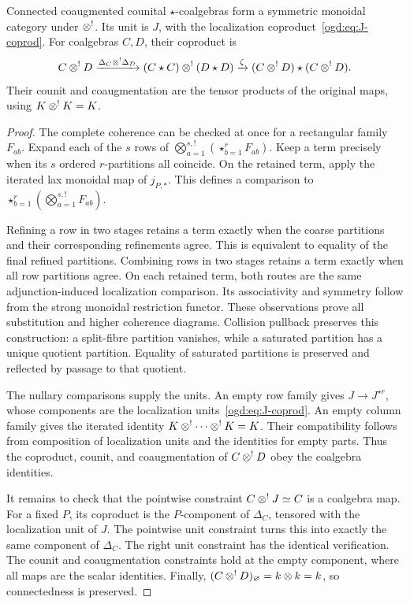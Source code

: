 \begin{proposition}\label{ogd:prop:coalgtensor}
Connected coaugmented counital \(\star\)-coalgebras form a symmetric monoidal category under \(\mathbin{\otimes^!}\).
Its unit is \(J\), with the localization coproduct~\eqref{ogd:eq:J-coprod}.
For coalgebras \(C,D\), their coproduct is
\[
 C\mathbin{\otimes^!} D\xrightarrow{\Delta_C\mathbin{\otimes^!}\Delta_D}
 (C\star C)\mathbin{\otimes^!}(D\star D)
 \xrightarrow\zeta(C\mathbin{\otimes^!} D)\star(C\mathbin{\otimes^!} D).
\]
Their counit and coaugmentation are the tensor products of the original maps, using \(K\mathbin{\otimes^!} K=K\).
\end{proposition}
\begin{proof}
The complete coherence can be checked at once for a rectangular family \(F_{ab}\).
Expand each of the \(s\) rows of
\(\bigotimes_{a=1}^{s,!}(\mathop\star_{b=1}^rF_{ab})\).
Keep a term precisely when its \(s\) ordered \(r\)-partitions all coincide.
On the retained term, apply the iterated lax monoidal map of \(j_{P,*}\).
This defines a comparison to
\(\mathop\star_{b=1}^r(\bigotimes_{a=1}^{s,!}F_{ab})\).

Refining a row in two stages retains a term exactly when the coarse partitions and their corresponding refinements agree.
This is equivalent to equality of the final refined partitions.
Combining rows in two stages retains a term exactly when all row partitions agree.
On each retained term, both routes are the same adjunction-induced localization comparison.
Its associativity and symmetry follow from the strong monoidal restriction functor.
These observations prove all substitution and higher coherence diagrams.
Collision pullback preserves this construction: a split-fibre partition vanishes, while a saturated partition has a unique quotient partition.
Equality of saturated partitions is preserved and reflected by passage to that quotient.

The nullary comparisons supply the units.
An empty row family gives \(J\to J^{\star r}\), whose components are the localization units~\eqref{ogd:eq:J-coprod}.
An empty column family gives the iterated identity \(K\mathbin{\otimes^!}\cdots\mathbin{\otimes^!} K=K\).
Their compatibility follows from composition of localization units and the identities for empty parts.
Thus the coproduct, counit, and coaugmentation of \(C\mathbin{\otimes^!} D\) obey the coalgebra identities.

It remains to check that the pointwise constraint \(C\mathbin{\otimes^!} J\simeq C\) is a coalgebra map.
For a fixed \(P\), its coproduct is the \(P\)-component of \(\Delta_C\), tensored with the localization unit of \(J\).
The pointwise unit constraint turns this into exactly the same component of \(\Delta_C\).
The right unit constraint has the identical verification.
The counit and coaugmentation constraints hold at the empty component, where all maps are the scalar identities.
Finally, \((C\mathbin{\otimes^!} D)_\varnothing=k\otimes k=k\), so connectedness is preserved.
\end{proof}

